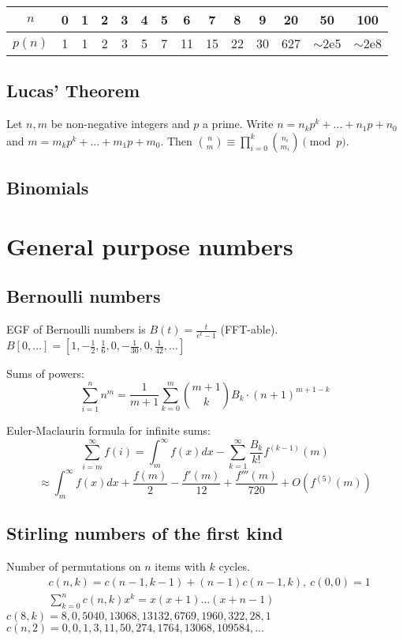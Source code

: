     \begin{center}
    \begin{tabular}{c|c@{\ }c@{\ }c@{\ }c@{\ }c@{\ }c@{\ }c@{\ }c@{\ }c@{\ }c@{\ }c@{\ }c@{\ }c}
      $n$    & 0 & 1 & 2 & 3 & 4 & 5 & 6  & 7  & 8  & 9  & 20  & 50  & 100 \\ \hline
      $p(n)$ & 1 & 1 & 2 & 3 & 5 & 7 & 11 & 15 & 22 & 30 & 627 & $\mathtt{\sim}$2e5 & $\mathtt{\sim}$2e8 \\
    \end{tabular}
    \end{center}

  \subsection{Lucas' Theorem}
    Let $n,m$ be non-negative integers and $p$ a prime. Write $n=n_kp^k+...+n_1p+n_0$ and $m=m_kp^k+...+m_1p+m_0$. Then $\binom{n}{m} \equiv \prod_{i=0}^k\binom{n_i}{m_i} \pmod{p}$.

  \subsection{Binomials}

\section{General purpose numbers}
  \subsection{Bernoulli numbers}
    EGF of Bernoulli numbers is $B(t)=\frac{t}{e^t-1}$ (FFT-able).
    $B[0,\ldots] = [1, -\frac{1}{2}, \frac{1}{6}, 0, -\frac{1}{30}, 0, \frac{1}{42}, \ldots]$

    Sums of powers:
    \small
    \[ \sum_{i=1}^n n^m = \frac{1}{m+1} \sum_{k=0}^m \binom{m+1}{k} B_k \cdot (n+1)^{m+1-k} \]
    \normalsize

    Euler-Maclaurin formula for infinite sums:
    \small
    \[ \sum_{i=m}^{\infty} f(i) = \int_m^\infty f(x) dx - \sum_{k=1}^\infty \frac{B_k}{k!}f^{(k-1)}(m) \]
    \[ \approx \int_{m}^\infty f(x)dx + \frac{f(m)}{2} - \frac{f'(m)}{12} + \frac{f'''(m)}{720} + O(f^{(5)}(m)) \]
    \normalsize

  \subsection{Stirling numbers of the first kind}
    Number of permutations on $n$ items with $k$ cycles.
    \begin{align*}
      &c(n,k) = c(n-1,k-1) + (n-1) c(n-1,k),\ c(0,0) = 1 \\
      &\textstyle \sum_{k=0}^n c(n,k)x^k = x(x+1) \dots (x+n-1)
    \end{align*}
    $c(8,k) = 8, 0, 5040, 13068, 13132, 6769, 1960, 322, 28, 1$ \\
    $c(n,2) = 0, 0, 1, 3, 11, 50, 274, 1764, 13068, 109584, \dots$

